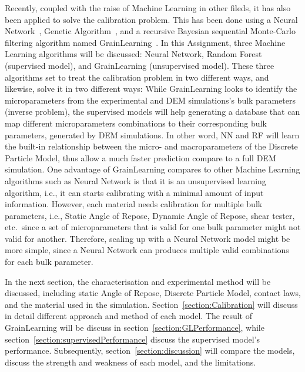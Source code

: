 Recently, coupled with the raise of Machine Learning in other fileds, it has also been applied to solve the calibration problem. This has been done using a Neural Network~\cite{nn-calibration, NN-GA, NN-coarse, YE2019292}, Genetic Algorithm~\cite{ga-calibration}, and a recursive Bayesian sequential Monte-Carlo filtering algorithm named GrainLearning~\cite{grainLearning}. In this Assignment, three Machine Learning algorithms will be discussed: Neural Network, Random Forest (supervised model), and GrainLearning (unsupervised model). These three algorithms set to treat the calibration problem in two different ways, and likewise, solve it in two different ways: While GrainLearning looks to identify the microparameters from the experimental and DEM simulations's bulk parameters (inverse problem), the supervised models will help generating a database that can map different microparameters combinations to their corresponding bulk parameters, generated by DEM simulations. In other word, NN and RF will learn the built-in relationship between the micro- and macroparameters of the Discrete Particle Model, thus allow a much faster prediction compare to a full DEM simulation. One advantage of GrainLearning compares to other Machine Learning algorithms such as Neural Network is that it is an unsupervised learning algorithm, i.e., it can starts calibrating with a minimal amount of input information. However, each material needs calibration for multiple bulk parameters, i.e., Static Angle of Repose, Dynamic Angle of Repose, shear tester, etc.~since a set of microparameters that is valid for one bulk parameter might not valid for another. Therefore, scaling up with a Neural Network model might be more simple, since a Neural Network can produces multiple valid combinations for each bulk parameter.  

In the next section, the characterisation and experimental method will be discussed, including static Angle of Repose, Discrete Particle Model, contact laws, and the material used in the simulation. Section~\ref{section:Calibration} will discuss in detail different approach and method of each model. The result of GrainLearning will be discuss in section~\ref{section:GLPerformance}, while section~\ref{section:supervisedPerformance} discuss the supervised model's performance. Subsequently, section~\ref{section:discussion} will compare the models, discuss the strength and weakness of each model, and the limitations.
